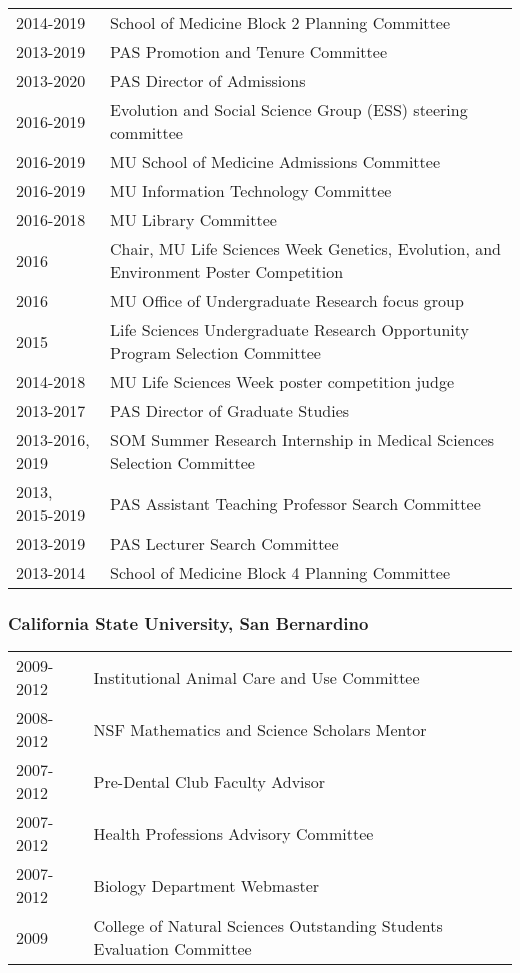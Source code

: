 \documentclass[10pt,letterpaper,]{article}
\begin{document}
\begin{tabular}{ll}
  2014-2019 & School of Medicine Block 2 Planning Committee \\ 
  2013-2019 & PAS Promotion and Tenure Committee \\ 
  2013-2020 & PAS Director of Admissions \\ 
  2016-2019 & Evolution and Social Science Group (ESS) steering committee \\ 
  2016-2019 & MU School of Medicine Admissions Committee \\ 
  2016-2019 & MU Information Technology Committee \\ 
  2016-2018 & MU Library Committee \\ 
  2016 & Chair, MU Life Sciences Week Genetics, Evolution, and Environment Poster Competition \\ 
  2016 & MU Office of Undergraduate Research focus group \\ 
  2015 & Life Sciences Undergraduate Research Opportunity Program Selection Committee \\ 
  2014-2018 & MU Life Sciences Week poster competition judge \\ 
  2013-2017 & PAS Director of Graduate Studies \\ 
  2013-2016, 2019 & SOM Summer Research Internship in Medical Sciences Selection Committee \\ 
  2013, 2015-2019 & PAS Assistant Teaching Professor Search Committee \\ 
  2013-2019 & PAS Lecturer Search Committee \\ 
  2013-2014 & School of Medicine Block 4 Planning Committee \\ 
  \end{tabular}

\hypertarget{california-state-university-san-bernardino-1}{%
\subsubsection{California State University, San
Bernardino}\label{california-state-university-san-bernardino-1}}

\begin{tabular}{ll}
  2009-2012 & Institutional Animal Care and Use Committee \\ 
  2008-2012 & NSF Mathematics and Science Scholars Mentor \\ 
  2007-2012 & Pre-Dental Club Faculty Advisor \\ 
  2007-2012 & Health Professions Advisory Committee \\ 
  2007-2012 & Biology Department Webmaster \\ 
  2009 & College of Natural Sciences Outstanding Students Evaluation Committee \\ 
  \end{tabular}
\end{document}
